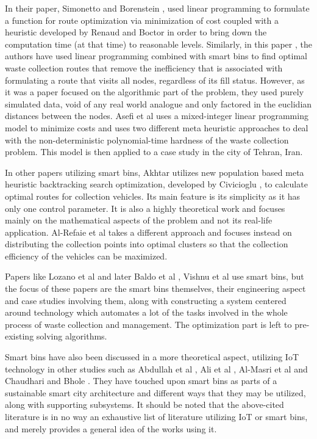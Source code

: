 \documentclass[12pt]{article}
\begin{document}
In their paper, Simonetto and Borenstein \cite{de2007decision}, used linear programming to formulate a function for route optimization via minimization of cost coupled with a heuristic developed by Renaud and Boctor \cite{renaud2002sweep} in order to bring down the computation time (at that time) to reasonable levels. Similarly, in this paper \cite{hannan2020waste}, the authors have used linear programming combined with smart bins to find optimal waste collection routes that remove the inefficiency that is associated with formulating a route that visits all nodes, regardless of its fill status. However, as it was a paper focused on the algorithmic part of the problem, they used purely simulated data, void of any real world analogue and only factored in the euclidian distances between the nodes. Asefi et al \cite{asefi2019mathematical} uses a mixed-integer linear programming model to minimize costs and uses two different meta heuristic approaches to deal with the non-deterministic polynomial-time hardness of the waste collection problem. This model is then applied to a case study in the city of Tehran, Iran. 

In other papers utilizing smart bins, Akhtar \cite{akhtar2017backtracking} utilizes new population based meta heuristic backtracking search optimization, developed by Civicioglu \cite{civicioglu2013backtracking}, to calculate optimal routes for collection vehicles. Its main feature is its simplicity as it has only one control parameter. It is also a highly theoretical work and focuses mainly on the mathematical aspects of the problem and not its real-life application. Al-Refaie et al \cite{al2021optimization} takes a different approach and focuses instead on distributing the collection points into optimal clusters so that the collection efficiency of the vehicles can be maximized.

Papers like Lozano et al \cite{lozano2018smart} and later Baldo et al \cite{baldo2021multi}, Vishnu et al \cite{vishnu2021iot} use smart bins, but the focus of these papers are the smart bins themselves, their engineering aspect and case studies involving them, along with constructing a system centered around technology which automates a lot of the tasks involved in the whole process of waste collection and management. The optimization part is left to pre-existing solving algorithms.

Smart bins have also been discussed in a more theoretical aspect, utilizing IoT technology in other studies such as Abdullah et al \cite{abdullah2018iot}, Ali et al \cite{ali2020iot}, Al-Masri et al \cite{al2018serverless} and Chaudhari and Bhole \cite{chaudhari2018solid}. They have touched upon smart bins as parts of a sustainable smart city architecture and different ways that they may be utilized, along with supporting subsystems. It should be noted that the above-cited literature is in no way an exhaustive list of literature utilizing IoT or smart bins, and merely provides a general idea of the works using it.
\end{document}
